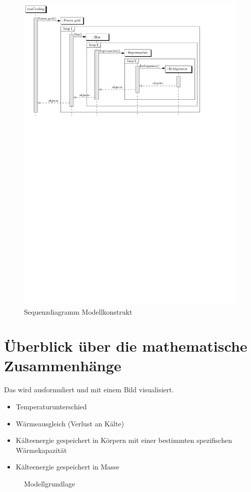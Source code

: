 \begin{figure}
\caption{Sequenzdiagramm Modellkonstrukt}
	\label{uml_sequence}
	\begin{center}
	\includegraphics[scale=0.8]{images/Theorie_Super/sequence_one}
	\end{center}
\end{figure}
%

\section{Überblick über die mathematische Zusammenhänge}

Das wird ausformuliert und mit einem Bild visualisiert.
\begin{itemize}
	\item Temperaturunterschied
	\item Wärmeausgleich (Verlust an Kälte)
	\item Kälteenergie gespeichert in Körpern mit einer bestimmten spezifischen Wärmekapazität
	\item Kälteenergie gespeichert in Masse
\end{itemize}
\begin{figure}\caption{ Modellgrundlage}
\end{figure}


